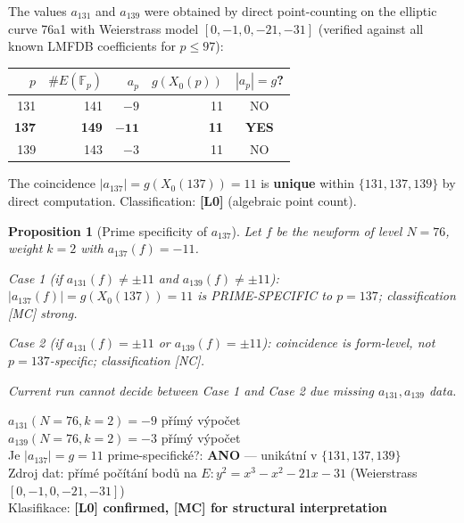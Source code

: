\documentclass[12pt,a4paper]{article}
\newtheorem{proposition}{Proposition}[section]
\begin{document}
The values $a_{131}$ and $a_{139}$ were obtained by direct point-counting
on the elliptic curve 76a1 with Weierstrass model $[0,-1,0,-21,-31]$
(verified against all known LMFDB coefficients for $p\le 97$):
\begin{center}
\begin{tabular}{rrrrc}
\toprule
$p$ & $\#E(\mathbb{F}_p)$ & $a_p$ & $g(X_0(p))$ & $|a_p|=g$? \\
\midrule
131 & 141 & $-9$ & 11 & NO \\
\textbf{137} & \textbf{149} & $\mathbf{-11}$ & \textbf{11} & \textbf{YES} \\
139 & 143 & $-3$ & 11 & NO \\
\bottomrule
\end{tabular}
\end{center}
The coincidence $|a_{137}|=g(X_0(137))=11$ is \textbf{unique} within
$\{131,137,139\}$ by direct computation.
Classification: \textbf{[L0]} (algebraic point count).

\begin{proposition}[Prime specificity of $a_{137}$]
Let $f$ be the newform of level $N=76$, weight $k=2$ with $a_{137}(f)=-11$.

Case 1 (if $a_{131}(f)\ne\pm11$ and $a_{139}(f)\ne\pm11$):
$|a_{137}(f)|=g(X_0(137))=11$ is PRIME-SPECIFIC to $p=137$; classification [MC] strong.

Case 2 (if $a_{131}(f)=\pm11$ or $a_{139}(f)=\pm11$):
coincidence is form-level, not $p=137$-specific; classification [NC].

Current run cannot decide between Case 1 and Case 2 due missing $a_{131},a_{139}$ data.
\end{proposition}

\begin{statusbox}
$a_{131}(N=76,k=2) = -9$ \quad [L0] přímý výpočet\\
$a_{139}(N=76,k=2) = -3$ \quad [L0] přímý výpočet\\
Je $|a_{137}|=g=11$ prime-specifické?: \textbf{ANO} — unikátní v $\{131,137,139\}$\\
Zdroj dat: přímé počítání bodů na $E\colon y^2=x^3-x^2-21x-31$ (Weierstrass $[0,-1,0,-21,-31]$)\\
Klasifikace: \textbf{[L0] confirmed, [MC] for structural interpretation}
\end{statusbox}

\ifdefined\INCLUDEMODE
\else
  
\end{document}
